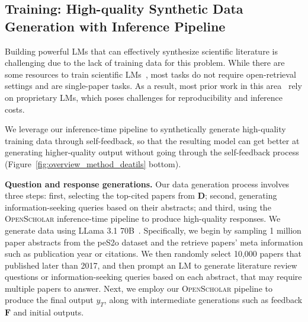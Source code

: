 \documentclass{article} %
\newcommand{\model}{\textsc{OpenScholar}\xspace}
\renewcommand{\paragraph}[1]{\noindent \textbf{#1}}
\begin{document}
\subsection{Training: High-quality Synthetic Data Generation with Inference Pipeline}
\label{subsec:self_reflective_training}

Building powerful LMs that can effectively synthesize scientific literature is challenging due to the lack of training data for this problem. While there are some resources to train scientific LMs~\citep{wadden2024sciriff}, most tasks do not require open-retrieval settings and are single-paper tasks. As a result, most prior work in this area~\citep{skarlinski2024language} rely on proprietary LMs, which poses challenges for reproducibility and inference costs.  

We leverage our inference-time pipeline to synthetically generate high-quality training data through self-feedback, so that the resulting model can get better at generating higher-quality output without going through the self-feedback process (Figure~\ref{fig:overview_method_deatils} bottom). 

\paragraph{Question and response generations.}
Our data generation process involves three steps: first, selecting the top-cited papers from $\mathbf{D}$; second, generating information-seeking queries based on their abstracts; and third, using the \model inference-time pipeline to produce high-quality responses. 
We generate data using LLama 3.1 70B~\citep{dubey2024llama}. 
Specifically, we begin by sampling 1 million paper abstracts from the peS2o dataset and the retrieve papers' meta information such as publication year or citations. 
We then randomly select 10,000 papers that published later than 2017, and then prompt an LM to generate literature review questions or information-seeking queries based on each abstract, that may require multiple papers to answer. 
Next, we employ our \model pipeline to produce the final output $y_T$, along with intermediate generations such as feedback $\mathbf{F}$ and initial outputs. 
\end{document}

